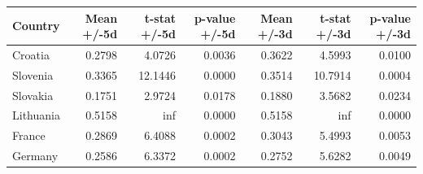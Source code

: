 \begin{tabular}{lrrrrrr}
\hline
Country & Mean +/-5d & t-stat +/-5d & p-value +/-5d & Mean +/-3d & t-stat +/-3d & p-value +/-3d \\
\hline
Croatia & 0.2798 & 4.0726 & 0.0036 & 0.3622 & 4.5993 & 0.0100 \\
Slovenia & 0.3365 & 12.1446 & 0.0000 & 0.3514 & 10.7914 & 0.0004 \\
Slovakia & 0.1751 & 2.9724 & 0.0178 & 0.1880 & 3.5682 & 0.0234 \\
Lithuania & 0.5158 & inf & 0.0000 & 0.5158 & inf & 0.0000 \\
France & 0.2869 & 6.4088 & 0.0002 & 0.3043 & 5.4993 & 0.0053 \\
Germany & 0.2586 & 6.3372 & 0.0002 & 0.2752 & 5.6282 & 0.0049 \\
\hline
\end{tabular}
